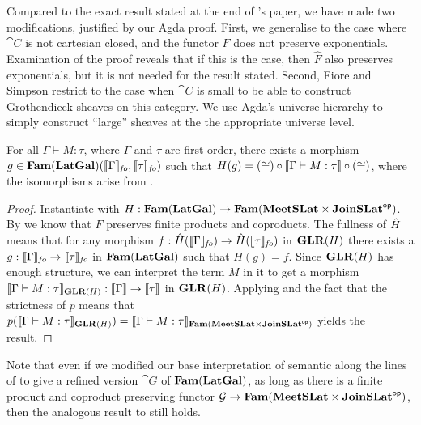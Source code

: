 \begin{remark}
  Compared to the exact result stated at the end of
  \citet{fiore-simpson99}'s paper, we have made two modifications,
  justified by our Agda proof. First, we generalise to the case where
  $\cat{C}$ is not cartesian closed, and the functor $F$ does not
  preserve exponentials. Examination of the proof reveals that if this
  is the case, then $\hat{F}$ also preserves exponentials, but it is
  not needed for the result stated. Second, Fiore and Simpson restrict
  to the case when $\cat{C}$ is small to be able to construct
  Grothendieck sheaves on this category. We use Agda's universe
  hierarchy to simply construct ``large'' sheaves at the the
  appropriate universe level.
\end{remark}

\begin{theorem}
  \label{thm:language-definability}
  For all $\Gamma \vdash M : \tau$, where $\Gamma$ and $\tau$ are
  first-order, there exists a morphism
  $g \in \mathbf{Fam}(\mathbf{LatGal})(\llbracket \Gamma \rrbracket_{\mathit{fo}},
  \llbracket \tau \rrbracket_{\mathit{fo}})$ such that
  $H(g) = (\cong) \circ \llbracket \Gamma \vdash M : \tau \rrbracket \circ (\cong)$,
  where the isomorphisms arise from
  .
\end{theorem}

\begin{proof}
  Instantiate  with
  $H : \mathbf{Fam}(\mathbf{LatGal}) \to \mathbf{Fam}(\mathbf{MeetSLat} \times
  \mathbf{JoinSLat}^{\mathsf{op}})$. By  we know that $F$
  preserves finite products and coproducts. The fullness of
  $\hat{H}$ means that for any morphism
  $f : \hat{H}(\llbracket \Gamma \rrbracket_{\mathit{fo}}) \to
  \hat{H}(\llbracket \tau \rrbracket_{\mathit{fo}})$ in $\mathbf{GLR}(H)$ there exists
  a $g : \llbracket \Gamma \rrbracket_{\mathit{fo}} \to \llbracket \tau \rrbracket_{\mathit{fo}}$ in
  $\mathbf{Fam}(\mathbf{LatGal})$ such that $H(g) = f$. Since $\mathbf{GLR}(H)$ has
  enough structure, we can interpret the term $M$ in it to get a
  morphism
  $\llbracket \Gamma \vdash M : \tau \rrbracket_{\mathbf{GLR}(H)} : \llbracket \Gamma \rrbracket \to
  \llbracket \tau \rrbracket$ in $\mathbf{GLR}(H)$. Applying
   and the fact that the
  strictness of $p$ means that
  $p(\llbracket \Gamma \vdash M : \tau \rrbracket_{\mathbf{GLR}(H)}) = \llbracket \Gamma
    \vdash M : \tau \rrbracket_{\mathbf{Fam}(\mathbf{MeetSLat} \times \mathbf{JoinSLat}^{\mathsf{op}})}$ yields
  the result.
\end{proof}

\begin{remark}
  Note that even if we modified our base interpretation of semantic
  \GPS along the lines of  to give a refined
  version $\cat{G}$ of $\mathbf{Fam}(\mathbf{LatGal})$, as long as there is a finite
  product and coproduct preserving functor
  $\mathcal{G} \to \mathbf{Fam}(\mathbf{MeetSLat} \times \mathbf{JoinSLat}^{\mathsf{op}})$, then the
  analogous result to  still holds.
\end{remark}

